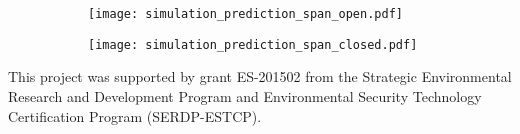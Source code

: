 \documentclass[journal=esthag,manuscript=article]{achemso}
\begin{document}
\begin{figure}[htb!]
  \caption{ }
  \label{fig:simulation_sampling}
  \begin{subfigure}{0.49\textwidth}
    \centering
    \caption{ }
    \label{fig:simulation_sampling_pp_open}
    \texttt{[image: simulation\_prediction\_span\_open.pdf]}
  \end{subfigure}
  \begin{subfigure}{0.49\textwidth}
    \centering
    \caption{ }
    \label{fig:simulation_sampling_pp_closed}
    \texttt{[image: simulation\_prediction\_span\_closed.pdf]}
  \end{subfigure}
\end{figure}


\begin{acknowledgement}
  This project was supported by grant ES-201502 from the Strategic Environmental Research and Development Program and Environmental Security Technology Certification Program (SERDP-ESTCP).
\end{acknowledgement}


\end{document}
